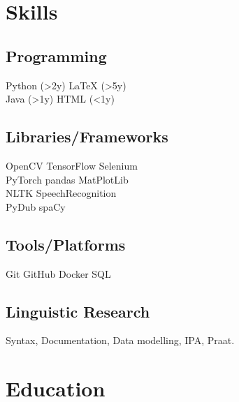 \documentclass[]{plushcv}
\begin{document}
\begin{minipage}[t]{0.25\textwidth} 


\section{Skills}
\subsection{Programming}
\sectionsep
{} 
Python (>2y) \textbullet{} LaTeX (>5y)  \\
\sectionsep
{}
Java (>1y) \textbullet{}  HTML (<1y) \\
\sectionsep
\subsection{Libraries/Frameworks}
\sectionsep
OpenCV \textbullet{} TensorFlow \textbullet{} Selenium\\
PyTorch \textbullet{} pandas \textbullet{} MatPlotLib \\
NLTK \textbullet{} SpeechRecognition \textbullet{} \\ 
PyDub \textbullet{} spaCy
\sectionsep
\subsection{Tools/Platforms}
\sectionsep
Git \textbullet{} GitHub \textbullet{} Docker \textbullet{} SQL \\
\sectionsep
\subsection{Linguistic Research}
\sectionsep
Syntax, Documentation, Data modelling, IPA, Praat.
\sectionsep


\section{Education} 



\end{minipage}
\end{document}
